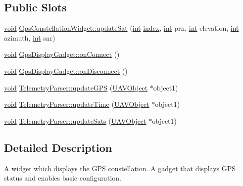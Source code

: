 \subsection*{Public Slots}
\begin{DoxyCompactItemize}
\item 
\hyperlink{group___u_a_v_objects_plugin_ga444cf2ff3f0ecbe028adce838d373f5c}{void} \hyperlink{group___g_p_s_gadget_plugin_gaa995e2d09a888698ad0aae9ba0a91ebf}{Gps\-Constellation\-Widget\-::update\-Sat} (\hyperlink{ioapi_8h_a787fa3cf048117ba7123753c1e74fcd6}{int} \hyperlink{glext_8h_ab47dd9958bcadea08866b42bf358e95e}{index}, \hyperlink{ioapi_8h_a787fa3cf048117ba7123753c1e74fcd6}{int} prn, \hyperlink{ioapi_8h_a787fa3cf048117ba7123753c1e74fcd6}{int} elevation, \hyperlink{ioapi_8h_a787fa3cf048117ba7123753c1e74fcd6}{int} azimuth, \hyperlink{ioapi_8h_a787fa3cf048117ba7123753c1e74fcd6}{int} snr)
\item 
\hyperlink{group___u_a_v_objects_plugin_ga444cf2ff3f0ecbe028adce838d373f5c}{void} \hyperlink{group___g_p_s_gadget_plugin_ga23030a328c534cd4b1eea152db173655}{Gps\-Display\-Gadget\-::on\-Connect} ()
\item 
\hyperlink{group___u_a_v_objects_plugin_ga444cf2ff3f0ecbe028adce838d373f5c}{void} \hyperlink{group___g_p_s_gadget_plugin_ga3f91bba10918be6c7bd99533e61883ac}{Gps\-Display\-Gadget\-::on\-Disconnect} ()
\item 
\hyperlink{group___u_a_v_objects_plugin_ga444cf2ff3f0ecbe028adce838d373f5c}{void} \hyperlink{group___g_p_s_gadget_plugin_ga9b1c1509701c154ad1c3cdeef0cb522b}{Telemetry\-Parser\-::update\-G\-P\-S} (\hyperlink{class_u_a_v_object}{U\-A\-V\-Object} $\ast$object1)
\item 
\hyperlink{group___u_a_v_objects_plugin_ga444cf2ff3f0ecbe028adce838d373f5c}{void} \hyperlink{group___g_p_s_gadget_plugin_gadc9bd95e3443207fbededb6a3fd014a7}{Telemetry\-Parser\-::update\-Time} (\hyperlink{class_u_a_v_object}{U\-A\-V\-Object} $\ast$object1)
\item 
\hyperlink{group___u_a_v_objects_plugin_ga444cf2ff3f0ecbe028adce838d373f5c}{void} \hyperlink{group___g_p_s_gadget_plugin_ga3bdc5591ff2751d19016d60668b18440}{Telemetry\-Parser\-::update\-Sats} (\hyperlink{class_u_a_v_object}{U\-A\-V\-Object} $\ast$object1)
\end{DoxyCompactItemize}


\subsection{Detailed Description}
A widget which displays the G\-P\-S constellation. A gadget that displays G\-P\-S status and enables basic configuration.

